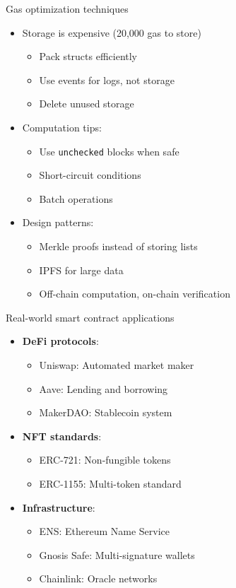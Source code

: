 \documentclass[aspectratio=169, lualatex, handout]{beamer}
\begin{document}
\begin{frame}{Gas optimization techniques}
	\begin{itemize}
		\item Storage is expensive (20,000 gas to store)
		      \begin{itemize}
			      \item Pack structs efficiently
			      \item Use events for logs, not storage
			      \item Delete unused storage
		      \end{itemize}
		\item Computation tips:
		      \begin{itemize}
			      \item Use \texttt{unchecked} blocks when safe
			      \item Short-circuit conditions
			      \item Batch operations
		      \end{itemize}
		\item Design patterns:
		      \begin{itemize}
			      \item Merkle proofs instead of storing lists
			      \item IPFS for large data
			      \item Off-chain computation, on-chain verification
		      \end{itemize}
	\end{itemize}
\end{frame}

\begin{frame}{Real-world smart contract applications}
	\begin{itemize}
		\item \textbf{DeFi protocols}:
		      \begin{itemize}
			      \item Uniswap: Automated market maker
			      \item Aave: Lending and borrowing
			      \item MakerDAO: Stablecoin system
		      \end{itemize}
		\item \textbf{NFT standards}:
		      \begin{itemize}
			      \item ERC-721: Non-fungible tokens
			      \item ERC-1155: Multi-token standard
		      \end{itemize}
		\item \textbf{Infrastructure}:
		      \begin{itemize}
			      \item ENS: Ethereum Name Service
			      \item Gnosis Safe: Multi-signature wallets
			      \item Chainlink: Oracle networks
		      \end{itemize}
	\end{itemize}
\end{frame}
\end{document}

